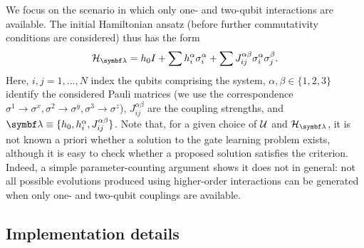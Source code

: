 We focus on the scenario in which only one- and two-qubit interactions are available. The initial Hamiltonian ansatz (before further commutativity conditions are considered) thus has the form
\begin{equation}
    \calH_\bslambda = h_0 I + \sum h^\alpha_{i} \sigma_i^\alpha + \sum J_{ij}^{\alpha\beta} \sigma_i^\alpha \sigma_j^\beta.
    \label{eq:GL:hamiltonian_atmostpairwise}
\end{equation}
Here, $i, j=1,...,N$ index the qubits comprising the system, $\alpha, \beta\in\{1,2,3\}$ identify the considered Pauli matrices (we use the correspondence $\sigma^1\rightarrow\sigma^x, \sigma^2\rightarrow\sigma^y, \sigma^3\rightarrow\sigma^z$), $J_{ij}^{\alpha\beta}$ are the coupling strengths, and $\bslambda\equiv \{h_0, h^\alpha_{i}, J_{ij}^{\alpha\beta}\}$.
Note that, for a given choice of ${\mathcal{U}}$ and $\calH_\bslambda$, it is not known a priori whether a solution to the gate learning problem exists, although it is easy to check whether a proposed solution satisfies the criterion.
Indeed, a simple parameter-counting argument shows it does not in general: not all possible evolutions produced using higher-order interactions can be generated when only one- and two-qubit couplings are available.


\subsection{Implementation details}
\label{subsec:GL:implementation_details}

